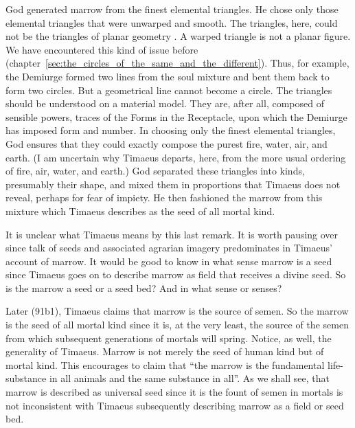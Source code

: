 God generated marrow from the finest elemental triangles. He chose only those elemental triangles that were unwarped and smooth. The triangles, here, could not be the triangles of planar geometry \citep[293 n2]{Cornford:1935fk}. A warped triangle is not a planar figure. We have encountered this kind of issue before (chapter~\ref{sec:the_circles_of_the_same_and_the_different}). Thus, for example, the Demiurge formed two lines from the soul mixture and bent them back to form two circles. But a geometrical line cannot become a circle. The triangles should be understood on a material model. They are, after all, composed of sensible powers, traces of the Forms in the Receptacle, upon which the Demiurge has imposed form and number. In choosing only the finest elemental triangles, God ensures that they could exactly compose the purest fire, water, air, and earth. (I am uncertain why Timaeus departs, here, from the more usual ordering of fire, air, water, and earth.) God separated these triangles into kinds, presumably their shape, and mixed them in proportions that Timaeus does not reveal, perhaps for fear of impiety. He then fashioned the marrow from this mixture which Timaeus describes as the seed of all mortal kind. 

It is unclear what Timaeus means by this last remark. It is worth pausing over since talk of seeds and associated agrarian imagery predominates in Timaeus' account of marrow. It would be good to know in what sense marrow is a seed since Timaeus goes on to describe marrow as field that receives a divine seed. So is the marrow a seed or a seed bed? And in what sense or senses?

Later (91b1), Timaeus claims that marrow is the source of semen. So the marrow is the seed of all mortal kind since it is, at the very least, the source of the semen from which subsequent generations of mortals will spring. Notice, as well, the generality of Timaeus. Marrow is not merely the seed of human kind \citep[73]{Waterfield:2008lx} but of mortal kind. This encourages \citet[295]{Cornford:1935fk} to claim that ``the marrow is the fundamental life-substance in all animals and the same substance in all''. As we shall see, that marrow is described as universal seed since it is the fount of semen in mortals is not inconsistent with Timaeus subsequently describing marrow as a field or seed bed.

